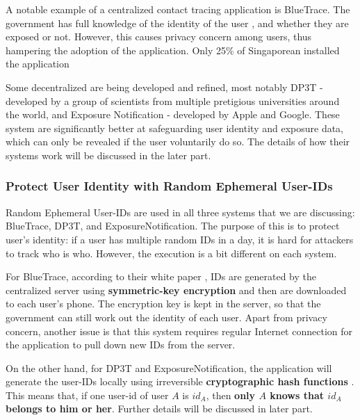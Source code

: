         \par A notable example of a centralized contact tracing application is BlueTrace. The government has full knowledge of the identity of the user \cite{BlueTrace1}, and whether they are exposed or not. However, this causes privacy concern among users, thus hampering the adoption of the application. Only 25\% of Singaporean installed the application \cite{UserAcceptance2}

        \par Some decentralized are being developed and refined, most notably DP3T - developed by a group of scientists from multiple pretigious universities around the world, and Exposure Notification - developed by Apple and Google. These system are significantly better at safeguarding user identity and exposure data, which can only be revealed if the user voluntarily do so. The details of how their systems work will be discussed in the later part.
  
  \subsubsection{Protect User Identity with Random Ephemeral User-IDs}
    \par Random Ephemeral User-IDs are used in all three systems that we are discussing: BlueTrace, DP3T, and ExposureNotification. The purpose of this is to protect user's identity: if a user has multiple random IDs in a day, it is hard for attackers to track who is who. However, the execution is a bit different on each system.
    \par For BlueTrace, according to their white paper \cite{BlueTrace1}, IDs are generated by the centralized server using \textbf{symmetric-key encryption} and then are downloaded to each user's phone. The encryption key is kept in the server, so that the government can still work out the identity of each user. Apart from privacy concern, another issue is that this system requires regular Internet connection for the application to pull down new IDs from the server.
    \par On the other hand, for DP3T and ExposureNotification, the application will generate the user-IDs locally using irreversible \textbf{cryptographic hash functions} \cite{DP3T1} \cite{ExpoNoti2}. This means that, if one user-id of user $A$ is $id_{A}$, then \textbf{only $A$ knows that $id_{A}$ belongs to him or her}. Further details will be discussed in later part.


